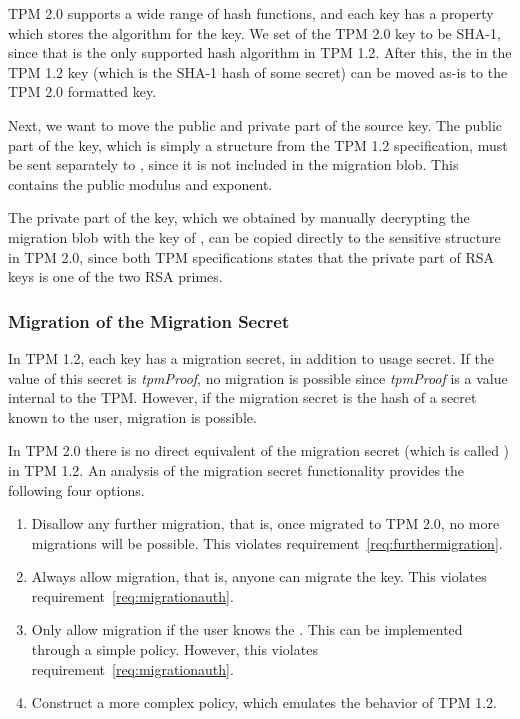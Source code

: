 {TPM 2.0 supports a wide range of hash functions, and each key has a property  which stores the algorithm for the key. We set  of the TPM 2.0 key to be SHA-1, since that is the only supported hash algorithm in TPM 1.2. After this, the  in the TPM 1.2 key (which is the SHA-1 hash of some secret) can be moved as-is to the TPM 2.0 formatted key.

Next, we want to move the public and private part of the source key. The public part of the key, which is simply a structure from the TPM 1.2 specification, must be sent separately to \ca{}, since it is not included in the migration blob. This contains the public modulus and exponent.

The private part of the key, which we obtained by manually decrypting the migration blob with the key of \ca{}, can be copied directly to the sensitive structure in TPM 2.0, since both TPM specifications states that the private part of RSA keys is one of the two RSA primes. %

\subsubsection{Migration of the Migration Secret} \label{sec:migmigkeymigauth}
In TPM 1.2, each key has a migration secret, in addition to usage secret. If the value of this secret is \emph{tpmProof}, no migration is possible since \emph{tpmProof} is a value internal to the TPM. However, if the migration secret is the hash of a secret known to the user, migration is possible.

In TPM 2.0 there is no direct equivalent of the migration secret (which is called ) in TPM 1.2.
An analysis of the migration secret functionality provides the following four options.

\begin{enumerate}
	\item Disallow any further migration, that is, once migrated to TPM 2.0, no more migrations will be possible. This violates requirement~\ref{req:furthermigration}.
	\item Always allow migration, that is, anyone can migrate the key. This violates requirement~\ref{req:migrationauth}.
	\item Only allow migration if the user knows the . This can be implemented through a simple policy. However, this violates requirement~\ref{req:migrationauth}.\label{itm:migrationsecretusage}
	\item Construct a more complex policy, which emulates the  behavior of TPM 1.2. \label{itm:migrationsecretmig}
\end{enumerate}

}
